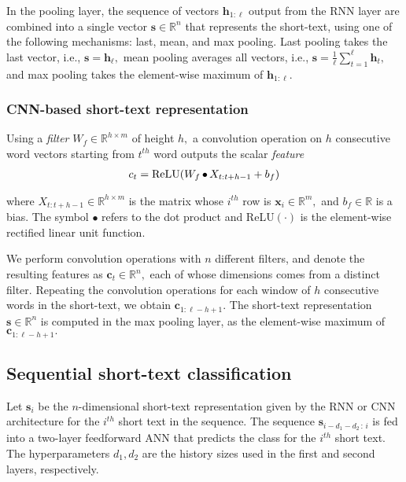 \documentclass[11pt,letterpaper]{article}
\begin{document}
In the pooling layer, the sequence of vectors $\mathbf{h}_{1:\ell}$
output from the RNN layer are combined into a single vector $\mathbf{s} \in \mathbb{R}^n$ that represents the short-text, using one of the following mechanisms: last, mean, and max pooling. Last pooling takes the last vector, i.e., $\mathbf{s} = \mathbf{h}_\ell,$ mean pooling averages all vectors, i.e., $\mathbf{s} = \tfrac{1}{\ell} \sum_{t=1}^\ell \mathbf{h}_t,$ and max pooling takes the element-wise maximum of $\mathbf{h}_{1:\ell}.$


\subsubsection{CNN-based short-text representation} \label{sec:cnn}
\noindent 
Using a \emph{filter} $W_f \in \mathbb{R}^{h \times m}$ of height $h,$  
a convolution operation on $h$ consecutive word vectors starting from $t^{th}$ word outputs the scalar \emph{feature} 
\vspace{-0.1cm}
\begin{align*}
c_t = \text{ReLU}(W_f \tiny{\, \bullet \,} X_{t:t+h-1} + b_f) 
\end{align*}
\vspace{-0.6cm}

\noindent where $X_{t:t+h-1} \in \mathbb{R}^{h \times m}$ is the matrix whose $i^{th}$ row is $\mathbf{x}_i \in \mathbb{R}^m,$
and $b_f \in \mathbb{R}$ is a bias. The symbol $\bullet$ refers to the dot product and ReLU$(\cdot)$ is the element-wise rectified linear unit function. 

We perform convolution operations with $n$ different filters, and denote the resulting features as $\mathbf{c}_t \in \mathbb{R}^n,$ each of whose dimensions comes from a distinct filter. 
Repeating the convolution operations for each window of $h$ consecutive words in the short-text, we obtain $\mathbf{c}_{1:\ell-h+1}.$
The short-text representation $\mathbf{s} \in \mathbb{R}^n$ is computed in the max pooling layer, as the element-wise maximum of $\mathbf{c}_{1:\ell-h+1}.$




\subsection{Sequential short-text classification} \label{sec:sequential}


Let $\mathbf{s}_i$ be the $n$-dimensional short-text representation given by the RNN or CNN architecture for the $i^{th}$ short text in the sequence.
The sequence $\mathbf{s}_{i-d_1-d_2 \, : \, i}$
is fed into a two-layer feedforward ANN that predicts the class for the $i^{th}$ short text. The hyperparameters $d_1, d_2$ are the history sizes used in the first and second layers, respectively.
 
\end{document}
